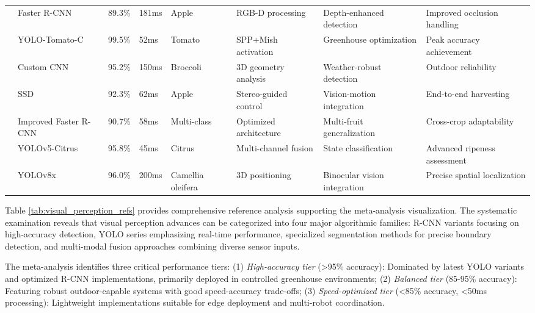 \documentclass[a4paper,fleqn]{cas-dc}
\begin{document}
\begin{table}[htbp]
\begin{tabular}{p{}p{}p{}p{}p{}p{}p{}p{}}
\cite{fu2020faster} & Faster R-CNN & 89.3\% & 181ms & Apple & RGB-D processing & Depth-enhanced detection & Improved occlusion handling \\

\cite{lawal2021tomato} & YOLO-Tomato-C & 99.5\% & 52ms & Tomato & SPP+Mish activation & Greenhouse optimization & Peak accuracy achievement \\

\cite{kusumam20173d} & Custom CNN & 95.2\% & 150ms & Broccoli & 3D geometry analysis & Weather-robust detection & Outdoor reliability \\

\cite{onishi2019automated} & SSD & 92.3\% & 62ms & Apple & Stereo-guided control & Vision-motion integration & End-to-end harvesting \\

\cite{wan2020faster} & Improved Faster R-CNN & 90.7\% & 58ms & Multi-class & Optimized architecture & Multi-fruit generalization & Cross-crop adaptability \\

\cite{yu2024object} & YOLOv5-Citrus & 95.8\% & 45ms & Citrus & Multi-channel fusion & State classification & Advanced ripeness assessment \\

\cite{ZHOU2024110} & YOLOv8x & 96.0\% & 200ms & Camellia oleifera & 3D positioning & Binocular vision integration & Precise spatial localization \\

\bottomrule
\end{tabular}
\end{table}

Table \ref{tab:visual_perception_refs} provides comprehensive reference analysis supporting the meta-analysis visualization. The systematic examination reveals that visual perception advances can be categorized into four major algorithmic families: R-CNN variants focusing on high-accuracy detection, YOLO series emphasizing real-time performance, specialized segmentation methods for precise boundary detection, and multi-modal fusion approaches combining diverse sensor inputs.

The meta-analysis identifies three critical performance tiers: (1) \textit{High-accuracy tier} (>95\% accuracy): Dominated by latest YOLO variants and optimized R-CNN implementations, primarily deployed in controlled greenhouse environments; (2) \textit{Balanced tier} (85-95\% accuracy): Featuring robust outdoor-capable systems with good speed-accuracy trade-offs; (3) \textit{Speed-optimized tier} (<85\% accuracy, <50ms processing): Lightweight implementations suitable for edge deployment and multi-robot coordination.
\end{document}
